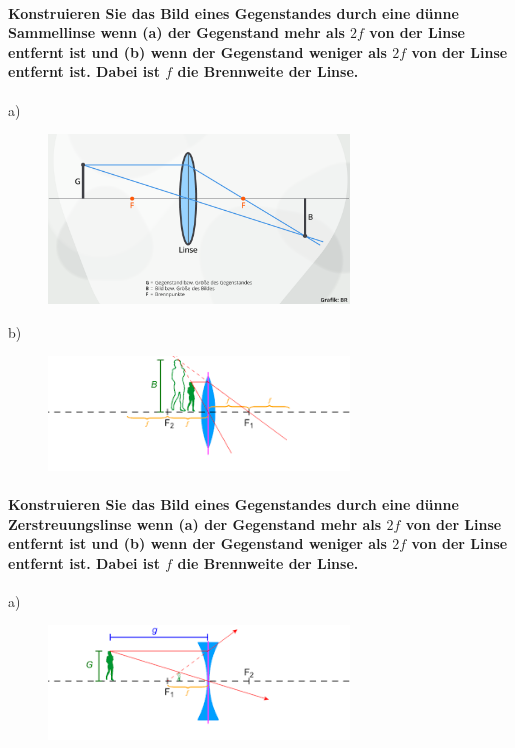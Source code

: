 \documentclass[a4paper, 11pt, ngerman, parskip=half-]{scrartcl}
\begin{document}
\paragraph{Konstruieren Sie das Bild eines Gegenstandes durch eine dünne Sammellinse wenn (a) der
    Gegenstand mehr als $2f$ von der Linse entfernt ist und (b) wenn der Gegenstand weniger als $2f$ von
    der Linse entfernt ist. Dabei ist $f$ die Brennweite der Linse.}

a)
\begin{figure}[H]
    \centering
    \includegraphics[width=8cm]{image/17/geo15a}
\end{figure}



b)
\begin{figure}[H]
    \centering
    \includegraphics[width=8cm]{image/17/geo15b}
\end{figure}







\paragraph{Konstruieren Sie das Bild eines Gegenstandes durch eine dünne Zerstreuungslinse wenn (a)
    der Gegenstand mehr als $2f$ von der Linse entfernt ist und (b) wenn der Gegenstand weniger
    als $2f$ von der Linse entfernt ist. Dabei ist $f$ die Brennweite der Linse.}


a)
\begin{figure}[H]
    \centering
    \includegraphics[width=8cm]{image/17/geo16a}
\end{figure}
\end{document}
